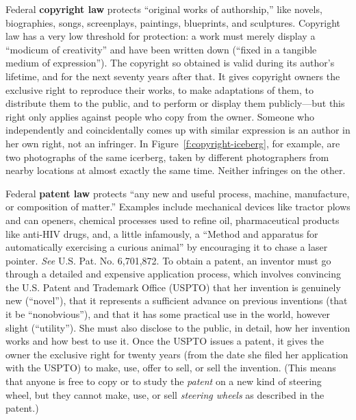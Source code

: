 
Federal \textbf{copyright law} protects ``original works of authorship,''
like novels, biographies, songs, screenplays, paintings, blueprints, and
sculptures. Copyright law has a very low threshold for protection: a work must
merely display a ``modicum of creativity'' and have been written down (``fixed
in a tangible medium of expression'').  The copyright so obtained is valid
during its author's lifetime, and for the next seventy years after that. It
gives copyright owners the exclusive right to reproduce their works, to make
adaptations of them, to distribute them to the public, and to perform or
display them publicly---but this right only applies against people who copy
from the owner. Someone who independently and coincidentally comes up with
similar expression is an author in her own right, not an infringer. In
Figure~\ref{f:copyright-iceberg}, for
example, are two photographs of the same icerberg, taken by different
photographers from nearby locations at almost exactly the same time. Neither
infringes on the other.

Federal \textbf{patent law} protects ``any new and useful process,
machine, manufacture, or composition of matter.'' Examples include mechanical
devices like tractor plows and can openers, chemical processes used to refine
oil, pharmaceutical products like anti-HIV drugs, and, a little infamously, a
``Method and apparatus for automatically exercising a curious animal'' by
encouraging it to chase a laser pointer. \textit{See} U.S. Pat. No. 6,701,872.
To obtain a patent, an inventor must go through a detailed and expensive
application process, which involves convincing the U.S. Patent and Trademark
Office (USPTO) that her invention is genuinely new (``novel''), that it
represents a sufficient advance on previous inventions (that it be
``nonobvious''), and that it has some practical use in the world, however
slight (``utility''). She must also disclose to the public, in detail, how her
invention works and how best to use it. Once the USPTO issues a patent, it
gives the owner the exclusive right for twenty years (from the date she filed
her application with the USPTO) to make, use, offer to sell, or sell the
invention. (This means that anyone is free to copy or to study the
\textit{patent} on a new kind of steering wheel, but they cannot make, use, or
sell \textit{steering wheels} as described in the patent.)


